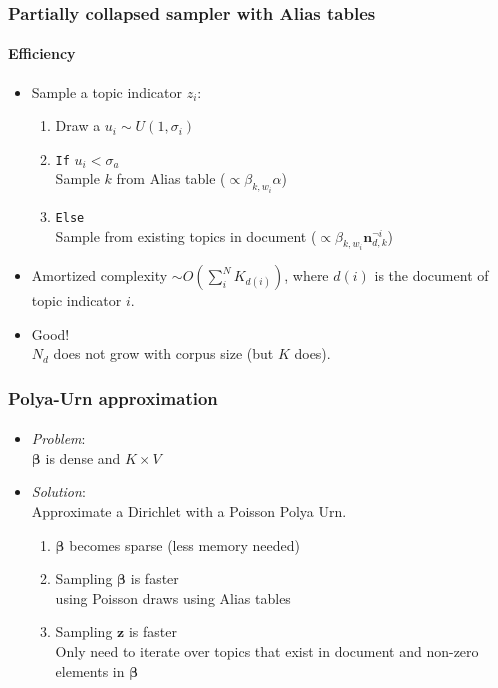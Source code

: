 \documentclass[compress]{beamer}
\begin{document}
\begin{frame}
\frametitle{Partially collapsed sampler with Alias tables}
\framesubtitle{Efficiency}


\begin{itemize}

\item Sample a topic indicator $z_i$:
\begin{enumerate}
\item Draw a $u_i \sim U(1,\sigma_i)$
\item \texttt{If} $u_i < \sigma_a$ \\
Sample $k$ from Alias table ($\propto \beta_{k,w_{i}}\alpha$)
\item \texttt{Else} \\ Sample from existing topics  in document ($\propto \beta_{k,w_{i}}\mathbf{n}^{\lnot i}_{d,k}$)
\end{enumerate}

\item Amortized complexity $\sim O(\sum^N_i K_{d(i)})$, where $d(i)$ is the document of topic indicator $i$.

\item Good! \\ $N_d$ does not grow with corpus size (but $K$ does).

\end{itemize}

\end{frame}




\begin{frame}
\frametitle{Polya-Urn approximation}
\framesubtitle{\cite{Terenin2018}}

\begin{itemize}
    \item \emph{Problem}: \\ $\mathbf{\beta}$ is dense and $K \times V$
    \item \emph{Solution}: \\ Approximate a Dirichlet with a Poisson Polya Urn.
    \begin{enumerate}
        \item $\mathbf{\beta}$ becomes sparse (less memory needed)
        \item Sampling $\mathbf{\beta}$ is faster \\ using Poisson draws using Alias tables
        \item Sampling $\mathbf{z}$ is faster \\ Only need to iterate over topics that exist in document and non-zero elements in $\mathbf{\beta}$
    \end{enumerate}
\end{itemize}

\end{frame}
\end{document}

